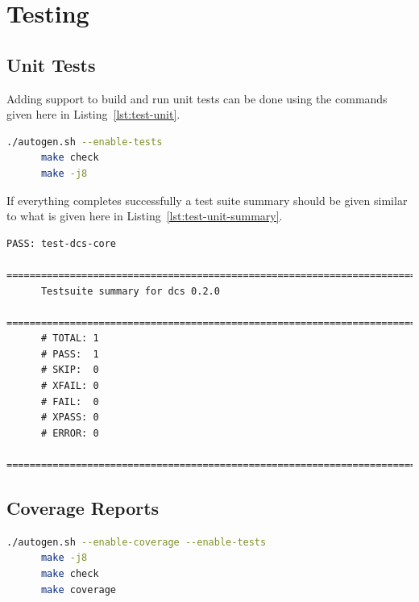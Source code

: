 \section{Testing}\label{sec:test}

  \subsection{Unit Tests}\label{sec:test-unit}

    Adding support to build and run unit tests can be done using the commands given here
    in Listing~\ref{lst:test-unit}.

    \begin{lstlisting}[language=bash,
                       caption={Compiling and Running Unit Tests},
                       label={lst:test-unit}]
      ./autogen.sh --enable-tests
      make check
      make -j8
    \end{lstlisting}

    If everything completes successfully a test suite summary should be given similar to
    what is given here in Listing~\ref{lst:test-unit-summary}.

    \begin{lstlisting}[caption={Test Suite Summary},
                       label={lst:test-unit-summary}]
      PASS: test-dcs-core
      ============================================================================
      Testsuite summary for dcs 0.2.0
      ============================================================================
      # TOTAL: 1
      # PASS:  1
      # SKIP:  0
      # XFAIL: 0
      # FAIL:  0
      # XPASS: 0
      # ERROR: 0
      ============================================================================
    \end{lstlisting}

  \subsection{Coverage Reports}\label{sec:test-cov}

    \begin{lstlisting}[language=bash,
                       caption={Generating Coverage Reports},
                       label={lst:test-cov}]
      ./autogen.sh --enable-coverage --enable-tests
      make -j8
      make check
      make coverage
    \end{lstlisting}


